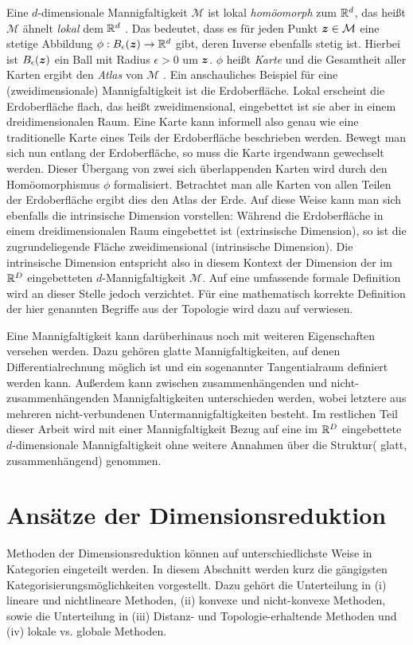 Eine $d$-dimensionale Mannigfaltigkeit $\mathcal{M}$ ist lokal \textit{homöomorph} zum $\mathbb{R}^d$,
das heißt $\mathcal{M}$ ähnelt \textit{lokal} dem $\mathbb{R}^d$ \parencite[3]{Lee.2011}. Das bedeutet, dass es für jeden Punkt $\bm{z} \in \mathcal{M}$ eine stetige
Abbildung $\phi: B_\epsilon(\bm{z}) \rightarrow \mathbb{R}^d$ gibt, deren Inverse ebenfalls stetig
ist. Hierbei ist $B_\epsilon(\bm{z})$ ein Ball mit Radius $\epsilon > 0$ um $\bm{z}$. $\phi$
heißt \textit{Karte} und die Gesamtheit aller Karten ergibt den \textit{Atlas} von $\mathcal{M}$ \parencite[4]{Cayton.2005}. Ein anschauliches Beispiel für eine (zweidimensionale) Mannigfaltigkeit ist
die Erdoberfläche. Lokal erscheint die Erdoberfläche flach, das heißt zweidimensional, eingebettet
ist sie aber in einem dreidimensionalen Raum. Eine Karte kann informell also genau wie eine
traditionelle Karte eines Teils der Erdoberfläche beschrieben werden. Bewegt man sich nun entlang
der Erdoberfläche, so muss die Karte irgendwann gewechselt werden. Dieser Übergang von zwei sich
überlappenden Karten wird durch den Homöomorphismus $\phi$ formalisiert. Betrachtet man alle Karten
von allen Teilen der Erdoberfläche ergibt dies den Atlas der Erde. Auf diese Weise kann man sich
ebenfalls die intrinsische Dimension vorstellen: Während die Erdoberfläche in einem
dreidimensionalen Raum eingebettet ist (extrinsische Dimension), so ist die zugrundeliegende Fläche
zweidimensional (intrinsische Dimension). Die intrinsische Dimension entspricht also in diesem
Kontext der Dimension der im $\mathbb{R}^D$ eingebetteten $d$-Mannigfaltigkeit $\mathcal{M}$. Auf eine
umfassende formale Definition wird an dieser Stelle jedoch verzichtet. Für eine mathematisch
korrekte Definition der hier genannten Begriffe aus der Topologie wird dazu auf
\textcites{Lee.2011}{Lee.2012} verwiesen.

Eine Mannigfaltigkeit kann darüberhinaus noch mit weiteren Eigenschaften versehen werden. Dazu
gehören glatte Mannigfaltigkeiten, auf denen Differentialrechnung möglich ist und ein sogenannter
Tangentialraum definiert werden kann. Außerdem kann zwischen zusammenhängenden und
nicht-zusammenhängenden Mannigfaltigkeiten unterschieden werden, wobei letztere aus mehreren
nicht-verbundenen Untermannigfaltigkeiten besteht. Im restlichen Teil dieser Arbeit wird mit einer
Mannigfaltigkeit Bezug auf eine im $\mathbb{R}^D$ eingebettete $d$-dimensionale Mannigfaltigkeit ohne
weitere Annahmen über die Struktur( glatt, zusammenhängend) genommen.

\section{Ansätze der Dimensionsreduktion}
\label{ch:Dimensionsreduktion:Ansaetze}
Methoden der Dimensionsreduktion können auf unterschiedlichste Weise in Kategorien eingeteilt werden. In diesem Abschnitt werden kurz die gängigsten Kategorisierungsmöglichkeiten vorgestellt. Dazu gehört die Unterteilung in (i) lineare und nichtlineare Methoden, (ii) konvexe und nicht-konvexe Methoden, sowie die Unterteilung in (iii) Distanz- und Topologie-erhaltende Methoden und (iv) lokale vs. globale Methoden.

